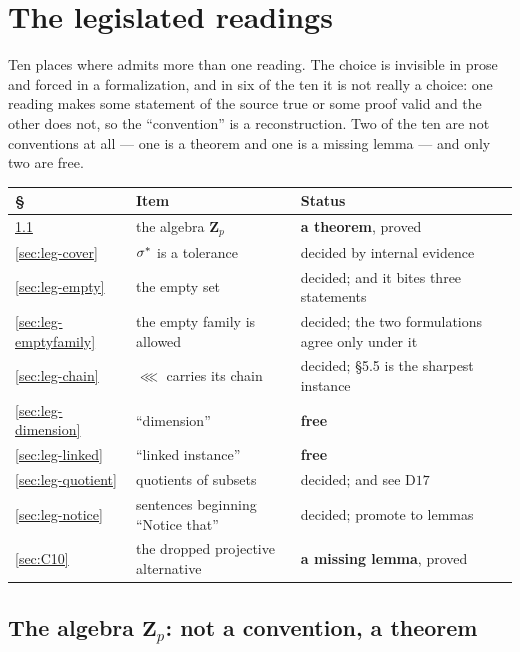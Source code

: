 \section{The legislated readings}\label{sec:readings}

Ten places where \cite{ZhukSimplified} admits more than one reading. The choice
is invisible in prose and forced in a formalization, and in six of the ten it is
not really a choice: one reading makes some statement of the source true or
some proof valid and the other does not, so the ``convention'' is a
reconstruction. Two of the ten are not conventions at all --- one is a theorem
and one is a missing lemma --- and only two are free.

\begin{center}\small
\begin{tabular}{@{}llp{}@{}}
\hline
\S & \textbf{Item} & \textbf{Status} \\
\hline
\ref{sec:leg-Zp} & the algebra $\mathbf Z_{p}$ & \textbf{a theorem}, proved \\
\ref{sec:leg-cover} & $\sigma^{*}$ is a tolerance & decided by internal evidence \\
\ref{sec:leg-empty} & the empty set & decided; and it bites three statements \\
\ref{sec:leg-emptyfamily} & the empty family is allowed & decided; the two formulations agree only under it \\
\ref{sec:leg-chain} & $\lll$ carries its chain & decided; \S5.5 is the sharpest instance \\
\ref{sec:leg-dimension} & ``dimension'' & \textbf{free} \\
\ref{sec:leg-linked} & ``linked instance'' & \textbf{free} \\
\ref{sec:leg-quotient} & quotients of subsets & decided; and see $\mathrm D17$ \\
\ref{sec:leg-notice} & sentences beginning ``Notice that'' & decided; promote to lemmas \\
\ref{sec:C10} & the dropped projective alternative & \textbf{a missing lemma}, proved \\
\hline
\end{tabular}
\end{center}

\subsection{The algebra $\mathbf Z_{p}$: not a convention, a theorem}
\label{sec:leg-Zp}

